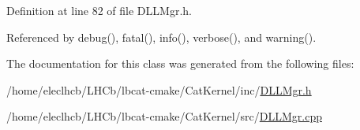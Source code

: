 Definition at line 82 of file DLLMgr.h.

Referenced by debug(), fatal(), info(), verbose(), and warning().

The documentation for this class was generated from the following files:\begin{DoxyCompactItemize}
\item 
/home/eleclhcb/LHCb/lbcat-\/cmake/CatKernel/inc/\hyperlink{DLLMgr_8h}{DLLMgr.h}\item 
/home/eleclhcb/LHCb/lbcat-\/cmake/CatKernel/src/\hyperlink{DLLMgr_8cpp}{DLLMgr.cpp}\end{DoxyCompactItemize}
